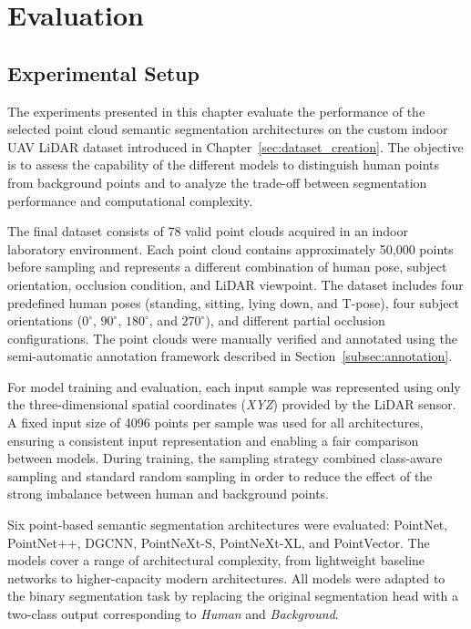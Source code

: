 \chapter{Evaluation}
\label{cha:evaluation}

\section{Experimental Setup}
\label{sec:experimental_setup}

The experiments presented in this chapter evaluate the performance of the selected point cloud semantic segmentation architectures on the custom indoor UAV LiDAR dataset introduced in Chapter~\ref{sec:dataset_creation}. The objective is to assess the capability of the different models to distinguish human points from background points and to analyze the trade-off between segmentation performance and computational complexity.

The final dataset consists of 78 valid point clouds acquired in an indoor laboratory environment. Each point cloud contains approximately 50,000 points before sampling and represents a different combination of human pose, subject orientation, occlusion condition, and LiDAR viewpoint. The dataset includes four predefined human poses (standing, sitting, lying down, and T-pose), four subject orientations ($0^\circ$, $90^\circ$, $180^\circ$, and $270^\circ$), and different partial occlusion configurations. The point clouds were manually verified and annotated using the semi-automatic annotation framework described in Section~\ref{subsec:annotation}.

For model training and evaluation, each input sample was represented using only the three-dimensional spatial coordinates (\textit{XYZ}) provided by the LiDAR sensor. A fixed input size of 4096 points per sample was used for all architectures, ensuring a consistent input representation and enabling a fair comparison between models. During training, the sampling strategy combined class-aware sampling and standard random sampling in order to reduce the effect of the strong imbalance between human and background points.

Six point-based semantic segmentation architectures were evaluated: PointNet, PointNet++, DGCNN, PointNeXt-S, PointNeXt-XL, and PointVector. The models cover a range of architectural complexity, from lightweight baseline networks to higher-capacity modern architectures. All models were adapted to the binary segmentation task by replacing the original segmentation head with a two-class output corresponding to \textit{Human} and \textit{Background}.

